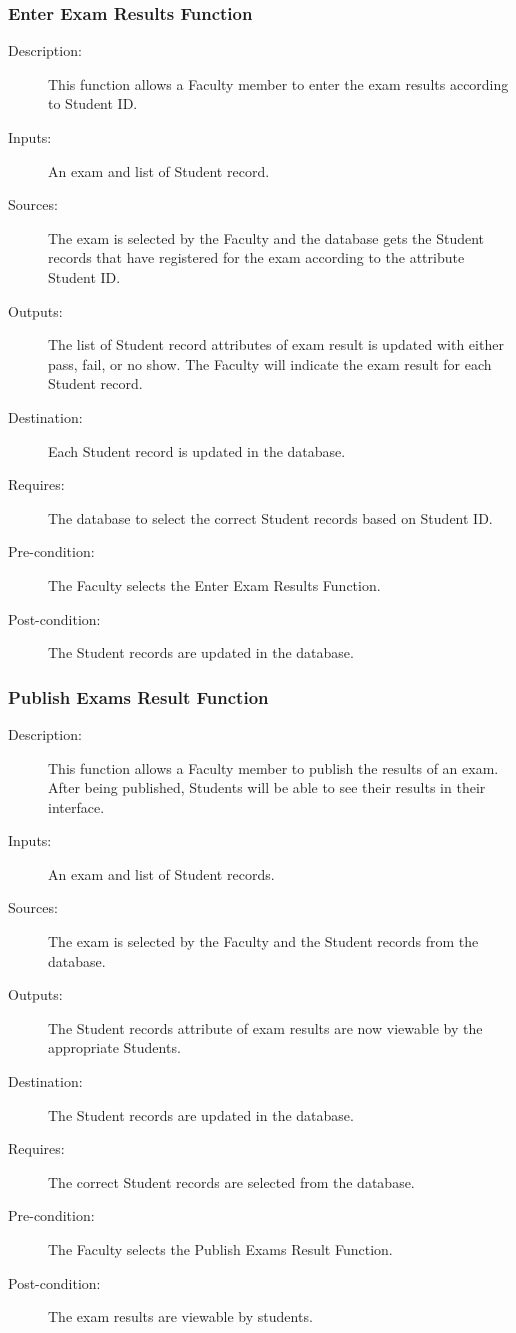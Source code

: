 \subsubsection{\large Enter Exam Results Function} 
\begin{boxed} %
\begin{description}
\item[Description:]
   This function allows a Faculty member to enter the exam results
   according to Student ID.
\item[Inputs:]
   An exam and list of Student record.
\item[Sources:]
   The exam is selected by the Faculty and the database gets the Student
   records that have registered for the exam according to the attribute
   Student ID.
\item[Outputs:]
   The list of Student record attributes of exam result is updated with
   either pass, fail, or no show. The Faculty will indicate the exam result for each
   Student record.
\item[Destination:]
   Each Student record is updated in the database.
\item[Requires:]
   The database to select the correct Student records based on Student ID.
\item[Pre-condition:]
   The Faculty selects the Enter Exam Results Function.
\item[Post-condition:]
   The Student records are updated in the database.
\end{description}
\end{boxed} %

\subsubsection{\large Publish Exams Result Function} 
\begin{boxed} %
\begin{description}
\item[Description:]
   This function allows a Faculty member to publish the results of an exam.
   After being published, Students will be able to see their results in their
   interface.
\item[Inputs:]
   An exam and list of Student records.
\item[Sources:]
   The exam is selected by the Faculty and the Student records 
   from the database.
\item[Outputs:]
   The Student records attribute of exam results are now viewable by the
   appropriate Students.
\item[Destination:]
   The Student records are updated in the database.
\item[Requires:]
   The correct Student records are selected from the database.
\item[Pre-condition:]
   The Faculty selects the Publish Exams Result Function.
\item[Post-condition:]
   The exam results are viewable by students.
\end{description}
\end{boxed} %

